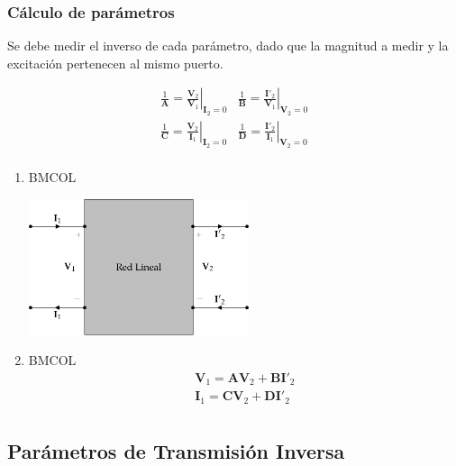 \subsubsection{Cálculo de parámetros}
\label{sec:org99ce061}

Se debe medir el inverso de cada parámetro, dado que la magnitud a medir y la excitación pertenecen al mismo puerto.

\renewcommand{\arraystretch}{3}
\[
  \begin{array}{cc}
    \frac{1}{\mathbf{A}} = \left.\frac{\mathbf{V}_2}{\mathbf{V}_1}\right\rvert_{\mathbf{I}_2 = 0} &
    \frac{1}{\mathbf{B}} = \left.\frac{\mathbf{I'}_2}{\mathbf{V}_1}\right\rvert_{\mathbf{V}_2 = 0}\\
    \frac{1}{\mathbf{C}} = \left.\frac{\mathbf{V}_2}{\mathbf{I}_1}\right\rvert_{\mathbf{I}_2 = 0} &
    \frac{1}{\mathbf{D}} = \left.\frac{\mathbf{I'}_2}{\mathbf{I}_1}\right\rvert_{\mathbf{V}_2 = 0}\\
  \end{array}
\]

\begin{enumerate}
\item \hfill{}\textsc{BMCOL}
\label{sec:orga42aeb3}
\begin{center}
\includegraphics[height=4cm]{../figs/cuadripolo_transmision.pdf}
\end{center}

\item \hfill{}\textsc{BMCOL}
\label{sec:orgb82d084}
\renewcommand{\arraystretch}{1}
\[
\begin{array}{l}
  \mathbf{V}_1 = \mathbf{A} \mathbf{V}_2 + \mathbf{B}\mathbf{I'}_2\\
  \mathbf{I}_1 = \mathbf{C} \mathbf{V}_2 + \mathbf{D} \mathbf{I'}_2\\
\end{array}
\]
\end{enumerate}


\subsection{Parámetros de Transmisión Inversa}
\label{sec:orgd62a71b}

